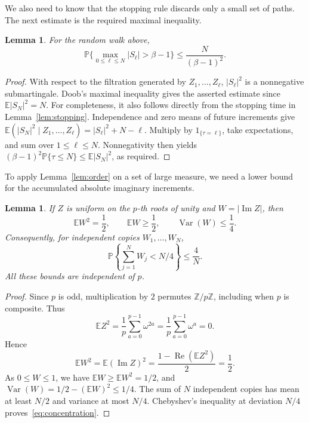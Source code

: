\documentclass[11pt]{amsart}
\newtheorem{lemma}[theorem]{Lemma}
\theoremstyle{definition}
\theoremstyle{remark}
\newcommand{\E}{\mathbb E}
\newcommand{\Prob}{\mathbb P}
\DeclareMathOperator{\Impart}{Im}
\DeclareMathOperator{\Repart}{Re}
\begin{document}
We also need to know that the stopping rule discards only a small set
of paths. The next estimate is the required maximal inequality.

\begin{lemma}\label{lem:crossing}
For the random walk above,
\begin{equation}
 \Prob\{\max_{0\leq\ell\leq N}|S_\ell|>\beta-1\}
 \leq\frac{N}{(\beta-1)^2}.
\end{equation}
\end{lemma}

\begin{proof}
With respect to the filtration generated by \(Z_1,\ldots,Z_\ell\),
\(|S_\ell|^2\) is a nonnegative submartingale. Doob's maximal
inequality gives
the asserted estimate since \(\E|S_N|^2=N\). For completeness, it
also follows directly from the stopping time in
Lemma~\ref{lem:stopping}. Independence
and zero means of future increments give
\(\E(|S_N|^2\mid Z_1,\ldots,Z_\ell)=|S_\ell|^2+N-\ell\).
Multiply by \(1_{\{\tau=\ell\}}\), take expectations, and sum over
\(1\leq\ell\leq N\). Nonnegativity then yields
\((\beta-1)^2\Prob\{\tau\leq N\}\leq\E|S_N|^2\), as required.
\end{proof}

To apply Lemma~\ref{lem:order} on a set of large measure, we need a lower
bound for the accumulated absolute imaginary increments.

\begin{lemma}\label{lem:moments}
If \(Z\) is uniform on the \(p\)-th roots of unity and
\(W=|\Impart Z|\), then
\[
 \E W^2=\frac12,\qquad \E W\geq\frac12,\qquad
 \operatorname{Var}(W)\leq\frac14.
\]
Consequently, for independent copies \(W_1,\ldots,W_N\),
\begin{equation}\label{eq:concentration}
 \Prob\left\{\sum_{j=1}^N W_j<N/4\right\}\leq\frac4N.
\end{equation}
All these bounds are independent of \(p\).
\end{lemma}

\begin{proof}
Since \(p\) is odd, multiplication by \(2\) permutes
\(\mathbb Z/p\mathbb Z\), including when \(p\) is composite. Thus
\[
 \E Z^2=\frac1p\sum_{a=0}^{p-1}\omega^{2a}
        =\frac1p\sum_{a=0}^{p-1}\omega^a=0.
\]
Hence
\[
 \E W^2=\E(\Impart Z)^2
       =\frac{1-\Repart(\E Z^2)}2=\frac12.
\]
As \(0\leq W\leq1\), we have \(\E W\geq\E W^2=1/2\), and
\(\operatorname{Var}(W)=1/2-(\E W)^2\leq1/4\).
The sum of \(N\) independent copies has mean at least \(N/2\)
and variance at most \(N/4\). Chebyshev's inequality at deviation
\(N/4\) proves~\eqref{eq:concentration}.
\end{proof}
\end{document}

